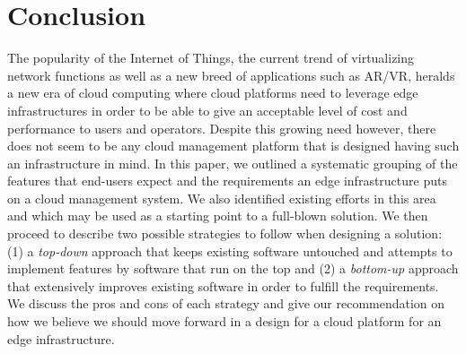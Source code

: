 
\section{Conclusion}
\label{sec:conclusion}

The popularity of the Internet of Things, the current trend of
virtualizing network functions as well as a new breed of applications
such as AR/VR, heralds a new era of cloud computing where cloud
platforms need to leverage edge infrastructures in order to be able to
give an acceptable level of cost and performance to users and
operators.  Despite this growing need however, there does not seem to
be any cloud management platform that is designed having such an
infrastructure in mind. In this paper, we outlined a systematic
grouping of the features that end-users expect and the requirements an
edge infrastructure puts on a cloud management system. We also
identified existing efforts in this area and which may be used as a
starting point to a full-blown solution. We then proceed to describe
two possible strategies to follow when designing a solution: (1) a
\emph{top-down} approach that keeps existing software untouched and
attempts to implement features by software that run on the top and (2)
a \emph{bottom-up} approach that extensively improves existing
software in order to fulfill the requirements. We discuss the pros and
cons of each strategy and give our recommendation on how we believe we
should move forward in a design for a cloud platform for an edge
infrastructure.


